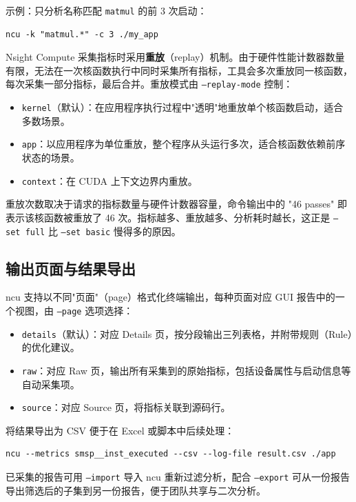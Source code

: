 示例：只分析名称匹配 \texttt{matmul} 的前 3 次启动：

\begin{lstlisting}
ncu -k "matmul.*" -c 3 ./my_app
\end{lstlisting}

Nsight Compute 采集指标时采用\textbf{重放}（replay）机制。由于硬件性能计数器数量有限，无法在一次核函数执行中同时采集所有指标，工具会多次重放同一核函数，每次采集一部分指标，最后合并。重放模式由 \texttt{--replay-mode} 控制：

\begin{itemize}
    \item \texttt{kernel}（默认）：在应用程序执行过程中"透明"地重放单个核函数启动，适合多数场景。
    \item \texttt{app}：以应用程序为单位重放，整个程序从头运行多次，适合核函数依赖前序状态的场景。
    \item \texttt{context}：在 CUDA 上下文边界内重放。
\end{itemize}

重放次数取决于请求的指标数量与硬件计数器容量，命令输出中的 "46 passes" 即表示该核函数被重放了 46 次。指标越多、重放越多、分析耗时越长，这正是 \texttt{--set full} 比 \texttt{--set basic} 慢得多的原因。

\subsection{输出页面与结果导出}

ncu 支持以不同"页面"（page）格式化终端输出，每种页面对应 GUI 报告中的一个视图，由 \texttt{--page} 选项选择：

\begin{itemize}
    \item \texttt{details}（默认）：对应 Details 页，按分段输出三列表格，并附带规则（Rule）的优化建议。
    \item \texttt{raw}：对应 Raw 页，输出所有采集到的原始指标，包括设备属性与启动信息等自动采集项。
    \item \texttt{source}：对应 Source 页，将指标关联到源码行。
\end{itemize}

将结果导出为 CSV 便于在 Excel 或脚本中后续处理：

\begin{lstlisting}
ncu --metrics smsp__inst_executed --csv --log-file result.csv ./app
\end{lstlisting}

已采集的报告可用 \texttt{--import} 导入 ncu 重新过滤分析，配合 \texttt{--export} 可从一份报告导出筛选后的子集到另一份报告，便于团队共享与二次分析。


